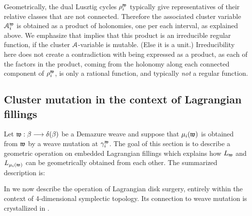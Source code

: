 \begin{remark}
Geometrically, the dual Lusztig cycles $\rho_i^{\mathfrak{w}}$ typically give representatives of their relative classes that are not connected. Therefore the associated cluster variable $\mathcal{A}_i^{\mathfrak{w}}$ is obtained as a product of holonomies, one per each interval, as explained above. We emphasize that  implies that this product is an irreducible regular function, if the cluster $\mathcal{A}$-variable is mutable. (Else it is a unit.) Irreducibility here does not create a contradiction with being expressed as a product, as each of the factors in the product, coming from the holonomy along each connected component of $\rho_i^{\mathfrak{w}}$, is only a rational function, and typically {\it not} a regular function.\sbs
\end{remark}

\subsection{Cluster mutation in the context of Lagrangian fillings}\label{ssec:cluster_mutation_Lagrangian_filling_from_weave} Let $\mathfrak{w}:\beta\longrightarrow\delta(\beta)$ be a Demazure weave and suppose that $\mu_i(\mathfrak{w})$ is obtained from $\mathfrak{w}$ by a weave mutation at $\gamma^{\mathfrak{w}}_i$. The goal of this section is to describe a geometric operation on embedded Lagrangian fillings which explains how $L_{\mathfrak{w}}$ and $L_{\mu_i(\mathfrak{w})}$ can be geometrically obtained from each other. The summarized description is:

\begin{center}
\end{center}
\vspace{0.2cm}

In  we now describe the operation of Lagrangian disk surgery, entirely within the context of 4-dimensional symplectic topology. Its connection to weave mutation is crystallized in .

